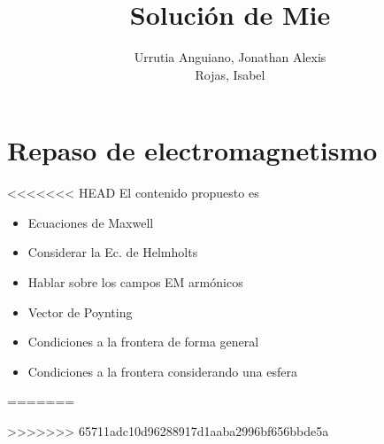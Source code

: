\documentclass[12pts,a4paper]{book}
\title{Solución de Mie}
\author{Urrutia Anguiano, Jonathan Alexis\\ Rojas, Isabel}
\begin{document}
	\frontmatter
	
	\maketitle
	\tableofcontents

	\cleardoublepage
%


\mainmatter


\chapter{Repaso de electromagnetismo}
\label{ch:repasoEM} %

<<<<<<< HEAD
	El contenido propuesto es

	\begin{itemize}
	 \item Ecuaciones de Maxwell
	 \item Considerar la Ec. de Helmholts
	 \item Hablar sobre los campos EM armónicos
	 \item Vector de Poynting
	 \item Condiciones a la frontera de forma general
	 \item Condiciones a la frontera considerando una esfera
	\end{itemize}
=======



>>>>>>> 65711adc10d96288917d1aaba2996bf656bbde5a
\end{document}
